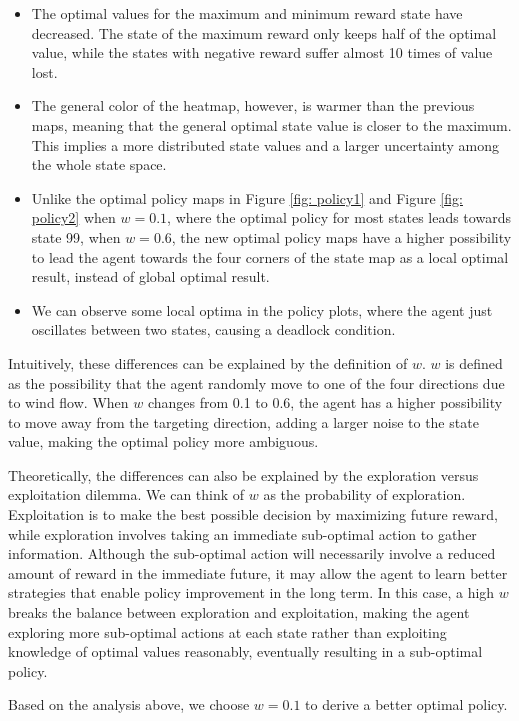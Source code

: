 \begin{itemize}
    \item The optimal values for the maximum and minimum reward state have decreased. The state of the maximum reward only keeps half of the optimal value, while the states with negative reward suffer almost 10 times of value lost. 
    \item The general color of the heatmap, however, is warmer than the previous maps, meaning that the general optimal state value is closer to the maximum. This implies a more distributed state values and a larger uncertainty among the whole state space.
    \item Unlike the optimal policy maps in Figure \ref{fig: policy1} and Figure \ref{fig: policy2} when $w=0.1$, where the optimal policy for most states leads towards state 99, when $w=0.6$, the new optimal policy maps have a higher possibility to lead the agent towards the four corners of the state map as a local optimal result, instead of global optimal result.
    \item We can observe some local optima in the policy plots, where the agent just oscillates between two states, causing a deadlock condition.
\end{itemize}

Intuitively, these differences can be explained by the definition of $w$. $w$ is defined as the possibility that the agent randomly move to one of the four directions due to wind flow. When $w$ changes from 0.1 to 0.6, the agent has a higher possibility to move away from the targeting direction, adding a larger noise to the state value, making the optimal policy more ambiguous.

Theoretically, the differences can also be explained by the exploration versus exploitation dilemma. We can think of $w$ as the probability of exploration. Exploitation is to make the best possible decision by maximizing future reward, while exploration involves taking an immediate sub-optimal action to gather information. Although the sub-optimal action will necessarily involve a reduced amount of reward in the
immediate future, it may allow the agent to learn better strategies that enable policy improvement in the long term. In this case, a high $w$ breaks the balance between exploration and exploitation, making the agent
exploring more sub-optimal actions at each state rather than exploiting knowledge of optimal values reasonably, eventually resulting in a sub-optimal policy.

Based on the analysis above, we choose $w=0.1$ to derive a better optimal policy.

